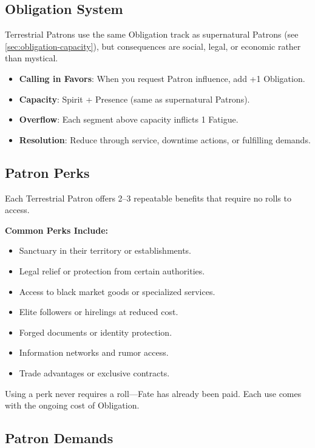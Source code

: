 \subsection{Obligation System}
\label{sec:terrestrial-obligation}

Terrestrial Patrons use the same Obligation track as supernatural Patrons (see \ref{sec:obligation-capacity}), but consequences are social, legal, or economic rather than mystical.

\begin{itemize}
    \item \textbf{Calling in Favors}: When you request Patron influence, add +1 Obligation.
    \item \textbf{Capacity}: Spirit + Presence (same as supernatural Patrons).
    \item \textbf{Overflow}: Each segment above capacity inflicts 1 Fatigue.
    \item \textbf{Resolution}: Reduce through service, downtime actions, or fulfilling demands.
\end{itemize}

\subsection{Patron Perks}
\label{sec:terrestrial-perks}

Each Terrestrial Patron offers 2--3 repeatable benefits that require no rolls to access.

\textbf{Common Perks Include:}
\begin{itemize}
    \item Sanctuary in their territory or establishments.
    \item Legal relief or protection from certain authorities.
    \item Access to black market goods or specialized services.
    \item Elite followers or hirelings at reduced cost.
    \item Forged documents or identity protection.
    \item Information networks and rumor access.
    \item Trade advantages or exclusive contracts.
\end{itemize}
Using a perk never requires a roll---Fate has already been paid. Each use comes with the ongoing cost of Obligation.

\subsection{Patron Demands}
\label{sec:terrestrial-demands}

